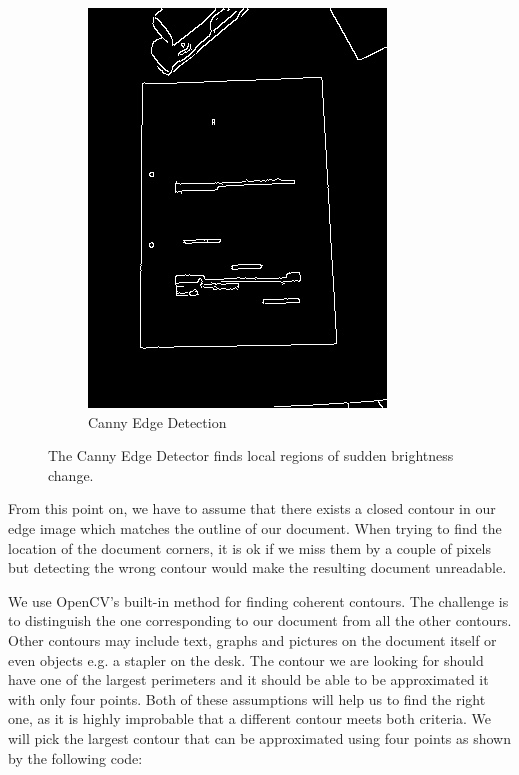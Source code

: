 \documentclass[bibliography=totoc]{scrartcl}
\begin{document}
\begin{figure}[ht!]
\begin{subfigure}[t]{0.3\linewidth}
		\includegraphics[width=\linewidth]{imgs/edges/cluttered_desk.jpg}
		\caption{Canny Edge Detection}
		\label{subfig:edges}
	\end{subfigure}
	\caption{The Canny Edge Detector finds local regions of sudden brightness change.}
\end{figure}

From this point on, we have to assume that there exists a closed contour in our edge image which matches the outline of our document.
When trying to find the location of the document corners, it is ok if we miss them by a couple of pixels but detecting the wrong contour would make the resulting document unreadable.

We use OpenCV's built-in method for finding coherent contours.
The challenge is to distinguish the one corresponding to our document from all the other contours.
Other contours may include text, graphs and pictures on the document itself or even objects e.g. a stapler on the desk.
The contour we are looking for should have one of the largest perimeters and it should be able to be approximated it with only four points.
Both of these assumptions will help us to find the right one, as it is highly improbable that a different contour meets both criteria. 
We will pick the largest contour that can be approximated using four points as shown by the following code: \\
\end{document}
